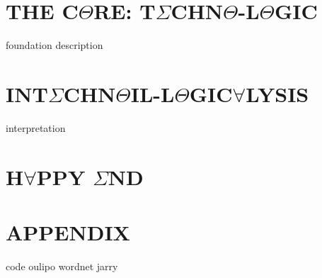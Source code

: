 \documentclass[oneside]{thesis}
\begin{document}
\part{\texorpdfstring{THE C$\Theta$RE: T$\Sigma$CHN$\Theta$-L$\Theta$GIC}{THE CORE: TECHNO-LOGIC}}
{foundation}
{description}

\part{\texorpdfstring{INT$\Sigma$CHN$\Theta$IL-L$\Theta$GIC$\forall$LYSIS}{INTECHNOIL-LOGICALYSIS}}
{interpretation}

\part{\texorpdfstring{H$\forall$PPY $\Sigma$ND}{HAPPY END}}

\backmatter

\appendix

\part{APPENDIX}
{code}
{oulipo}
{wordnet}
{jarry}
\clearpage

\pagestyle{plain}
{}
\clearpage

{}
\printnoidxglossary
\clearpage
\end{document}

